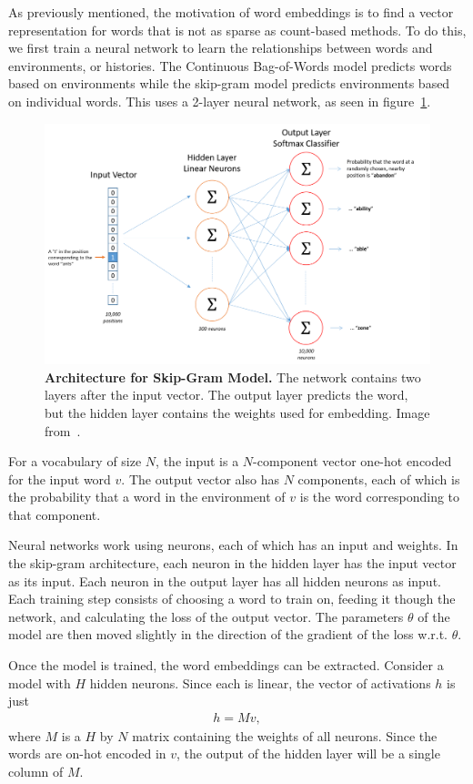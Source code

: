 \documentclass{article} %
\begin{document}
As previously mentioned, the motivation of word embeddings is to find a vector representation for words that is not as sparse as count-based methods. To do this, we first train a neural network to learn the relationships between words and environments, or histories. The Continuous Bag-of-Words model predicts words based on environments while the skip-gram model predicts environments based on individual words. This uses a 2-layer neural network, as seen in figure~\ref{fig:skipgram}. 

\begin{figure}[h]
	\centering
	\includegraphics[width=.5\textwidth]{skip_gram_net_arch}
	\caption{\textbf{Architecture for Skip-Gram Model.} The network contains two layers after the input vector. The output layer predicts the word, but the hidden layer contains the weights used for embedding. Image from~\cite{mccormick}.}
	\label{fig:skipgram}
\end{figure}

For a vocabulary of size $N$, the input is a $N$-component vector one-hot encoded for the input word $v$. The output vector also has $N$ components, each of which is the probability that a word in the environment of $v$ is the word corresponding to that component. 

Neural networks work using neurons, each of which has an input and weights. In the skip-gram architecture, each neuron in the hidden layer has the input vector as its input. Each neuron in the output layer has all hidden neurons as input. Each training step consists of choosing a word to train on, feeding it though the network, and calculating the loss of the output vector. The parameters $\theta$ of the model are then moved slightly in the direction of the gradient of the loss w.r.t. $\theta$.

Once the model is trained, the word embeddings can be extracted. Consider a model with $H$ hidden neurons. Since each is linear, the vector of activations $h$ is just
\begin{align}
h=Mv, \label{eqn:hidden}
\end{align}
where $M$ is a $H$ by $N$ matrix containing the weights of all neurons. Since the words are on-hot encoded in $v$, the output of the hidden layer will be a single column of $M$. 
\end{document}
